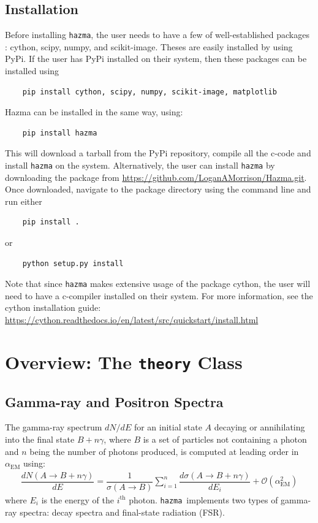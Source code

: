 \documentclass[review]{elsarticle}
\newcommand{\mil}[1]{\texttt{#1}}
\newcommand{\hazma}{\mil{hazma}}
\begin{document}
\subsection{Installation}

Before installing \texttt{hazma}, the user needs to have a few of well-established packages : cython, scipy, numpy, and scikit-image. Theses are easily installed by using PyPi. If the user has PyPi installed on their system, then these packages can be installed using
\begin{verbatim}
	pip install cython, scipy, numpy, scikit-image, matplotlib
\end{verbatim}
Hazma can be installed in the same way, using:
\begin{verbatim}
	pip install hazma
\end{verbatim}
This will download a tarball from the PyPi repository, compile all the c-code and install \texttt{hazma} on the system. Alternatively, the user can install \texttt{hazma} by downloading the package from \url{https://github.com/LoganAMorrison/Hazma.git}. Once downloaded, navigate to the package directory using the command line and run either
\begin{verbatim}
	pip install .
\end{verbatim}
or
\begin{verbatim}
	python setup.py install
\end{verbatim}


Note that since \texttt{hazma} makes extensive usage of the package cython, the user will need to have a c-compiler installed on their system. For more information, see the cython installation guide: \url{https://cython.readthedocs.io/en/latest/src/quickstart/install.html}




\section{Overview: The \texttt{theory} Class}%
\label{sec:overview_the_theory_class}



\subsection{Gamma-ray and Positron Spectra}
The gamma-ray spectrum \(dN/dE\) for an initial state \(A\) decaying or annihilating into the final state \(B + n\gamma\), where \(B\) is a set of particles not containing a photon and \(n\) being the number of photons produced, is computed at leading order in \(\alpha_{\mathrm{EM}}\)	using:
\begin{align}
	\dfrac{dN(A\to B + n\gamma)}{dE} = \dfrac{1}{\sigma(A\to B)}\sum_{i=1}^{n}\dfrac{d\sigma(A\to B + n\gamma)}{dE_{i}} + \mathcal{O}(\alpha_{\mathrm{EM}}^{2})
\end{align}
where \(E_{i}\) is the energy of the \(i^{\mathrm{th}}\) photon. \hazma\ implements two types of gamma-ray spectra: decay spectra and final-state radiation (FSR).
\end{document}
